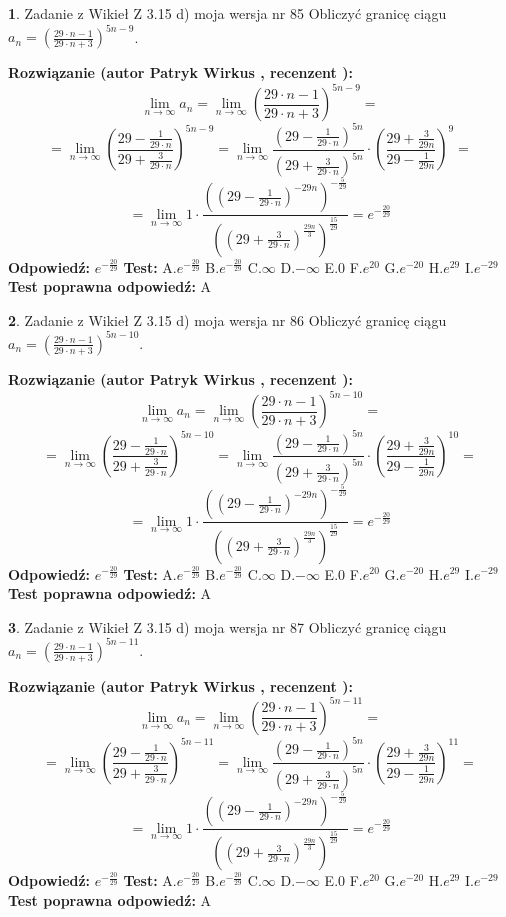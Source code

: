 \documentclass[12pt, a4paper]{article}
\theoremstyle{definition} %
\newtheorem{zad}{}
\newcommand{\zadStart}[1]{\begin{zad}#1\newline}
\newcommand{\zadStop}{\end{zad}}
\newcommand{\rozwStart}[2]{\noindent \textbf{Rozwiązanie (autor #1 , recenzent #2): }\newline}
\newcommand{\rozwStop}{\newline}
\newcommand{\odpStart}{\noindent \textbf{Odpowiedź:}\newline}
\newcommand{\odpStop}{\newline}
\newcommand{\testStart}{\noindent \textbf{Test:}\newline}
\newcommand{\testStop}{\newline}
\newcommand{\kluczStart}{\noindent \textbf{Test poprawna odpowiedź:}\newline}
\newcommand{\kluczStop}{\newline}
\begin{document}
\zadStart{Zadanie z Wikieł Z 3.15 d) moja wersja nr 85}
Obliczyć granicę ciągu $a_{n}=(\frac{29\cdot n - 1}{29 \cdot n + 3})^{5n-9}$.
\zadStop
\rozwStart{Patryk Wirkus}{}
$$\lim\limits_{n\to\infty} a_{n} = \lim\limits_{n\to\infty}(\frac{29\cdot n - 1}{29 \cdot n + 3})^{5n-9}=$$
$$=\lim\limits_{n\to\infty}(\frac{29 - \frac{1}{29\cdot n}}{29 + \frac{3}{29 \cdot n}})^{5n-9}=\lim\limits_{n\to\infty}\frac{(29 - \frac{1}{29\cdot n})^{5n}}{(29 + \frac{3}{29\cdot n})^{5n}} \cdot (\frac{29+\frac{3}{29n}}{29-\frac{1}{29n}})^{9}=$$
$$=\lim\limits_{n\to\infty} 1 \cdot \frac{((29-\frac{1}{29 \cdot n})^{-29n})^{-\frac{5}{29}}}{((29+\frac{3}{29 \cdot n})^{\frac{29n}{3}})^{\frac{15}{29}}} =e^{-\frac{20}{29}}$$
\rozwStop
\odpStart
$e^{-\frac{20}{29}}$
\odpStop
\testStart
A.$ e^{-\frac{20}{29}}$
B.$ e^{-\frac{20}{29}}$
C.$\infty$
D.$-\infty$
E.$0$
F.$e^{20}$
G.$e^{-20}$
H.$e^{29}$
I.$e^{-29}$
\testStop
\kluczStart
A
\kluczStop



\zadStart{Zadanie z Wikieł Z 3.15 d) moja wersja nr 86}
Obliczyć granicę ciągu $a_{n}=(\frac{29\cdot n - 1}{29 \cdot n + 3})^{5n-10}$.
\zadStop
\rozwStart{Patryk Wirkus}{}
$$\lim\limits_{n\to\infty} a_{n} = \lim\limits_{n\to\infty}(\frac{29\cdot n - 1}{29 \cdot n + 3})^{5n-10}=$$
$$=\lim\limits_{n\to\infty}(\frac{29 - \frac{1}{29\cdot n}}{29 + \frac{3}{29 \cdot n}})^{5n-10}=\lim\limits_{n\to\infty}\frac{(29 - \frac{1}{29\cdot n})^{5n}}{(29 + \frac{3}{29\cdot n})^{5n}} \cdot (\frac{29+\frac{3}{29n}}{29-\frac{1}{29n}})^{10}=$$
$$=\lim\limits_{n\to\infty} 1 \cdot \frac{((29-\frac{1}{29 \cdot n})^{-29n})^{-\frac{5}{29}}}{((29+\frac{3}{29 \cdot n})^{\frac{29n}{3}})^{\frac{15}{29}}} =e^{-\frac{20}{29}}$$
\rozwStop
\odpStart
$e^{-\frac{20}{29}}$
\odpStop
\testStart
A.$ e^{-\frac{20}{29}}$
B.$ e^{-\frac{20}{29}}$
C.$\infty$
D.$-\infty$
E.$0$
F.$e^{20}$
G.$e^{-20}$
H.$e^{29}$
I.$e^{-29}$
\testStop
\kluczStart
A
\kluczStop



\zadStart{Zadanie z Wikieł Z 3.15 d) moja wersja nr 87}
Obliczyć granicę ciągu $a_{n}=(\frac{29\cdot n - 1}{29 \cdot n + 3})^{5n-11}$.
\zadStop
\rozwStart{Patryk Wirkus}{}
$$\lim\limits_{n\to\infty} a_{n} = \lim\limits_{n\to\infty}(\frac{29\cdot n - 1}{29 \cdot n + 3})^{5n-11}=$$
$$=\lim\limits_{n\to\infty}(\frac{29 - \frac{1}{29\cdot n}}{29 + \frac{3}{29 \cdot n}})^{5n-11}=\lim\limits_{n\to\infty}\frac{(29 - \frac{1}{29\cdot n})^{5n}}{(29 + \frac{3}{29\cdot n})^{5n}} \cdot (\frac{29+\frac{3}{29n}}{29-\frac{1}{29n}})^{11}=$$
$$=\lim\limits_{n\to\infty} 1 \cdot \frac{((29-\frac{1}{29 \cdot n})^{-29n})^{-\frac{5}{29}}}{((29+\frac{3}{29 \cdot n})^{\frac{29n}{3}})^{\frac{15}{29}}} =e^{-\frac{20}{29}}$$
\rozwStop
\odpStart
$e^{-\frac{20}{29}}$
\odpStop
\testStart
A.$ e^{-\frac{20}{29}}$
B.$ e^{-\frac{20}{29}}$
C.$\infty$
D.$-\infty$
E.$0$
F.$e^{20}$
G.$e^{-20}$
H.$e^{29}$
I.$e^{-29}$
\testStop
\kluczStart
A
\kluczStop
\end{document}
